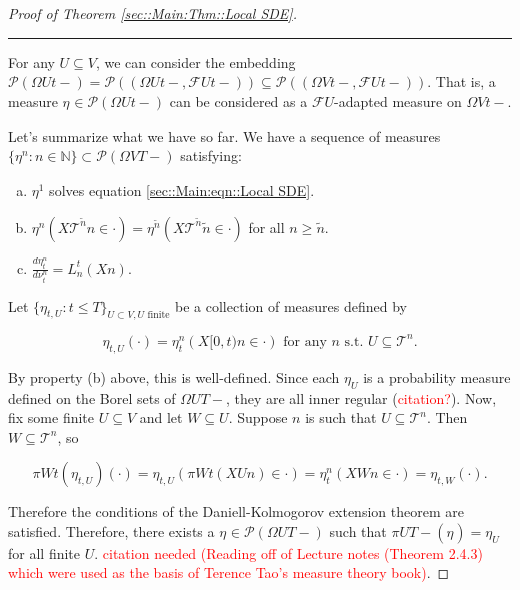 \documentclass[12pt]{article}
\newcommand{\mb}{\mathbb}
\newcommand{\mc}{\mathcal}
\newcommand{\ms}{\mathscr}
\newcommand{\te}{\text}
\newcommand{\tr}{\textcolor{red}}
\newcommand{\ind}{\hspace{24pt}}
\newcommand{\lin}{\rule{\linewidth}{0.4 pt}}
\newcommand{\pmsr}{\mc{P}}							%
\renewcommand{\U}{U}							%
\newcommand{\UU}{W}								%
\newcommand{\T}{T}								%
\renewcommand{\t}{t}							%
\newcommand{\proj}{\pi}							%
\newcommand{\F}{\mc{F}}							%
\newcommand{\X}{X}								%
\newcommand{\pup}[1]{^{#1}}							%
\newcommand{\tree}{\mc{T}}							%
\newcommand{\V}{V}									%
\newcommand{\numb}{n}								%
\newcommand{\mm}[3]{\nu_{#2#1}^{#3}}						%
\newcommand{\mmm}[3]{\eta_{#2#1}^{#3}}						%
\newcommand{\alt}{\widetilde}						%
\newcommand{\dense}[2]{L_{#1}^{#2}}				%
\begin{document}
\begin{proof}[Proof of Theorem \ref{sec::Main:Thm::Local SDE}]
\lin

For any \(\U\subseteq \V\), we can consider the embedding \(\pmsr\left(\Omega{\U}{\t-}\right) = \pmsr\left((\Omega{\U}{\t-},\F{\U}{\t-})\right) \subseteq \pmsr\left((\Omega{\V}{\t-},\F{\U}{\t-})\right)\). That is, a measure \(\mmm{}{}{}\in \pmsr\left(\Omega{\U}{\t-}\right)\) can be considered as a \(\F{\U}{}\)-adapted measure on \(\Omega{\V}{\t-}\).

\ind Let's summarize what we have so far. We have a sequence of measures \(\{\mmm{}{}{\numb}:\numb\in\mb{N}\} \subset \pmsr(\Omega{\V}{\T-})\) satisfying:

\begin{enumerate}[(a)]
\item \(\mmm{}{}{1}\) solves equation \eqref{sec::Main:eqn::Local SDE}.

\item \(\mmm{}{}{\numb}(\X{\tree\pup{\alt{\numb}}}{}{\numb} \in \cdot) = \mmm{}{}{\alt{\numb}}(\X{\tree\pup{\alt{\numb}}}{}{\alt{\numb}}\in \cdot)\) for all \(\numb \geq \alt{\numb}\).

\item \(\frac{d\mmm{}{\t}{\numb}}{d\mm{}{\t}{\numb}} = \dense{\numb}{\t}(\X{}{}{\numb})\).
\end{enumerate}

Let \(\{\mmm{\U}{\t,}{}:\t \leq \T\}_{\U\subset \V,\U\te{ finite}}\) be a collection of measures defined by

\[\mmm{\U}{\t,}{}(\cdot) = \mmm{}{\t}{\numb}(\X{}{[0,\t)}{\numb} \in \cdot) \te{ for any }\numb\te{ s.t. }\U \subseteq \tree\pup{\numb}.\]

By property (b) above, this is well-defined. Since each \(\mmm{\U}{}{}\) is a probability measure defined on the Borel sets of \(\Omega{\U}{\T-}\), they are all inner regular (\tr{citation?}). Now, fix some finite \(\U\subseteq \V\) and let \(\UU \subseteq \U\). Suppose \(\numb\) is such that \(\U \subseteq \tree\pup{\numb}\). Then \(\UU\subseteq \tree\pup{\numb}\), so

\[\proj{\UU}{\t}(\mmm{\U}{\t,}{})(\cdot) = \mmm{\U}{\t,}{}\left(\proj{\UU}{\t}(\X{\U}{}{\numb}) \in \cdot\right) = \mmm{}{\t}{\numb}\left(\X{\UU}{}{\numb} \in \cdot\right) = \mmm{\UU}{\t,}{}(\cdot).\]

Therefore the conditions of the Daniell-Kolmogorov extension theorem are satisfied. Therefore, there exists a \(\mmm{}{}{}\in \ms{P}(\Omega{\U}{\T-})\) such that \(\proj{\U}{\T-}(\mmm{}{}{}) =\mmm{\U}{}{}\) for all finite \(\U\). \tr{citation needed (Reading off of Lecture notes (Theorem 2.4.3) which were used as the basis of Terence Tao's measure theory book)}.


\end{proof}
\end{document}
